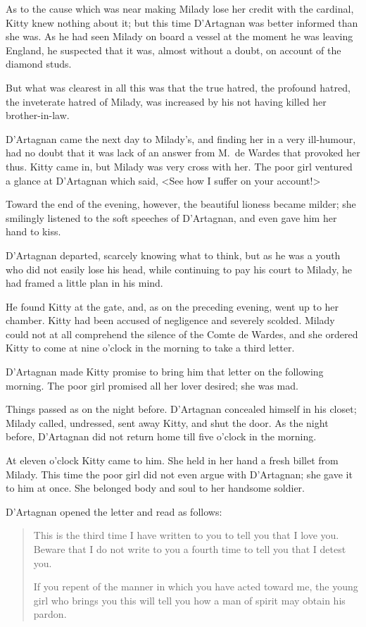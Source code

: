 As to the cause which was near making Milady lose her credit with the cardinal, Kitty knew nothing about it; but this time D'Artagnan was better informed than she was. As he had seen Milady on board a vessel at the moment he was leaving England, he suspected that it was, almost without a doubt, on account of the diamond studs. 

But what was clearest in all this was that the true hatred, the profound hatred, the inveterate hatred of Milady, was increased by his not having killed her brother-in-law. 

D'Artagnan came the next day to Milady's, and finding her in a very ill-humour, had no doubt that it was lack of an answer from M.~de Wardes that provoked her thus. Kitty came in, but Milady was very cross with her. The poor girl ventured a glance at D'Artagnan which said, <See how I suffer on your account!> 

Toward the end of the evening, however, the beautiful lioness became milder; she smilingly listened to the soft speeches of D'Artagnan, and even gave him her hand to kiss. 

D'Artagnan departed, scarcely knowing what to think, but as he was a youth who did not easily lose his head, while continuing to pay his court to Milady, he had framed a little plan in his mind. 

He found Kitty at the gate, and, as on the preceding evening, went up to her chamber. Kitty had been accused of negligence and severely scolded. Milady could not at all comprehend the silence of the Comte de Wardes, and she ordered Kitty to come at nine o'clock in the morning to take a third letter. 

D'Artagnan made Kitty promise to bring him that letter on the following morning. The poor girl promised all her lover desired; she was mad. 

Things passed as on the night before. D'Artagnan concealed himself in his closet; Milady called, undressed, sent away Kitty, and shut the door. As the night before, D'Artagnan did not return home till five o'clock in the morning. 

At eleven o'clock Kitty came to him. She held in her hand a fresh billet from Milady. This time the poor girl did not even argue with D'Artagnan; she gave it to him at once. She belonged body and soul to her handsome soldier. 

D'Artagnan opened the letter and read as follows: 

\begin{quotation}
This is the third time I have written to you to tell you that I love you. Beware that I do not write to you a fourth time to tell you that I detest you.

If you repent of the manner in which you have acted toward me, the young girl who brings you this will tell you how a man of spirit may obtain his pardon. 
\end{quotation}

